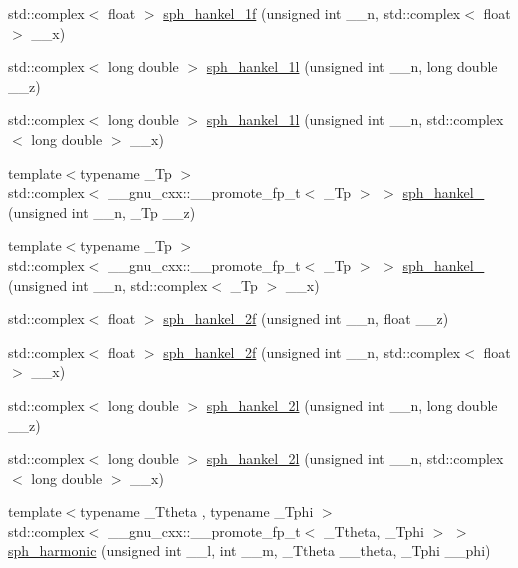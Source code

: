 \begin{DoxyCompactItemize}
\item 
std\+::complex$<$ float $>$ \hyperlink{group__gnu__math__spec__func_gadbb875cd50abb62ac75386143486bb2c}{sph\+\_\+hankel\+\_\+1f} (unsigned int \+\_\+\+\_\+n, std\+::complex$<$ float $>$ \+\_\+\+\_\+x)
\item 
std\+::complex$<$ long double $>$ \hyperlink{group__gnu__math__spec__func_ga6e77fd5cddfbd57d9120b20fc6c30e6f}{sph\+\_\+hankel\+\_\+1l} (unsigned int \+\_\+\+\_\+n, long double \+\_\+\+\_\+z)
\item 
std\+::complex$<$ long double $>$ \hyperlink{group__gnu__math__spec__func_ga3e9d889d8f2e4792e892b12b1f5948b9}{sph\+\_\+hankel\+\_\+1l} (unsigned int \+\_\+\+\_\+n, std\+::complex$<$ long double $>$ \+\_\+\+\_\+x)
\item 
{\footnotesize template$<$typename \+\_\+\+Tp $>$ }\\std\+::complex$<$ \+\_\+\+\_\+gnu\+\_\+cxx\+::\+\_\+\+\_\+promote\+\_\+fp\+\_\+t$<$ \+\_\+\+Tp $>$ $>$ \hyperlink{group__gnu__math__spec__func_gafb5debe7f7db9e9e456c065acf738f64}{sph\+\_\+hankel\+\_} (unsigned int \+\_\+\+\_\+n, \+\_\+\+Tp \+\_\+\+\_\+z)
\item 
{\footnotesize template$<$typename \+\_\+\+Tp $>$ }\\std\+::complex$<$ \+\_\+\+\_\+gnu\+\_\+cxx\+::\+\_\+\+\_\+promote\+\_\+fp\+\_\+t$<$ \+\_\+\+Tp $>$ $>$ \hyperlink{group__gnu__math__spec__func_ga211067788880febb07e9b49e20db001e}{sph\+\_\+hankel\+\_} (unsigned int \+\_\+\+\_\+n, std\+::complex$<$ \+\_\+\+Tp $>$ \+\_\+\+\_\+x)
\item 
std\+::complex$<$ float $>$ \hyperlink{group__gnu__math__spec__func_ga9496b81f94b8ba0162cf45df72be1e71}{sph\+\_\+hankel\+\_\+2f} (unsigned int \+\_\+\+\_\+n, float \+\_\+\+\_\+z)
\item 
std\+::complex$<$ float $>$ \hyperlink{group__gnu__math__spec__func_ga4c3194b71831b265811f987cbbf6e031}{sph\+\_\+hankel\+\_\+2f} (unsigned int \+\_\+\+\_\+n, std\+::complex$<$ float $>$ \+\_\+\+\_\+x)
\item 
std\+::complex$<$ long double $>$ \hyperlink{group__gnu__math__spec__func_ga6d3ead73a4f0bfeeb0aa1fd99daaf3b1}{sph\+\_\+hankel\+\_\+2l} (unsigned int \+\_\+\+\_\+n, long double \+\_\+\+\_\+z)
\item 
std\+::complex$<$ long double $>$ \hyperlink{group__gnu__math__spec__func_ga3d9d9aaceba455a5ddc79d178ee1cb6d}{sph\+\_\+hankel\+\_\+2l} (unsigned int \+\_\+\+\_\+n, std\+::complex$<$ long double $>$ \+\_\+\+\_\+x)
\item 
{\footnotesize template$<$typename \+\_\+\+Ttheta , typename \+\_\+\+Tphi $>$ }\\std\+::complex$<$ \+\_\+\+\_\+gnu\+\_\+cxx\+::\+\_\+\+\_\+promote\+\_\+fp\+\_\+t$<$ \+\_\+\+Ttheta, \+\_\+\+Tphi $>$ $>$ \hyperlink{group__gnu__math__spec__func_gadca3d25c4f7eed15099d8f80681d4055}{sph\+\_\+harmonic} (unsigned int \+\_\+\+\_\+l, int \+\_\+\+\_\+m, \+\_\+\+Ttheta \+\_\+\+\_\+theta, \+\_\+\+Tphi \+\_\+\+\_\+phi)

\end{DoxyCompactItemize}
